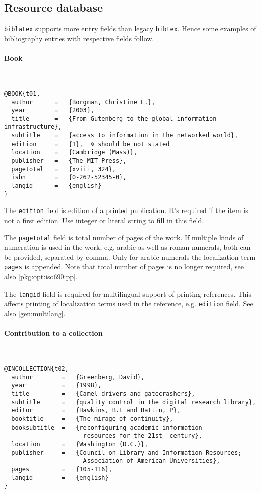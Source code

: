 \documentclass[a4paper,10pt]{ltxdockit}
\def\t|#1|{\texttt{#1}}
\def\c#1{%
\hangpara{3em}{1}%
\fullcite{#1}}
\begin{document}
\subsection{Resource database}

\t|biblatex| supports more entry fields than legacy \t|bibtex|. Hence
some examples of bibliography entries with respective fields follow.


\paragraph{Book} \hfill\\

\c{t01}
\begin{verbatim}
@BOOK{t01,
  author      =   {Borgman, Christine L.}, 
  year        =   {2003},
  title       =   {From Gutenberg to the global information infrastructure}, 
  subtitle    =   {access to information in the networked world},
  edition     =   {1},  % should be not stated
  location    =   {Cambridge (Mass)}, 
  publisher   =   {The MIT Press},
  pagetotal   =   {xviii, 324},
  isbn        =   {0-262-52345-0},
  langid      =   {english}
}
\end{verbatim} 

The \t|edition| field is edition of a printed publication. It's required
if the item is not a first edition. Use integer or literal string to fill in
this field.

The \t|pagetotal| field is total number of pages of the work. If multiple
kinds of numeration is used in the work, e.g. arabic as well as roman numerals,
both can be provided, separated by comma. Only for arabic numerals
the localization term \t|pages| is appended. Note that total number of pages
is no longer required, see also \ref{pkg:opt:iso690:pp}.

The \t|langid| field is required for multilingual support of printing
references. This affects printing of localization terms used in the reference,
e.g. \t|edition| field. See also \ref{gen:multilang}.

\paragraph{Contribution to a collection} \hfill\\

\c{t02}
\begin{verbatim}
@INCOLLECTION{t02,
  author        =   {Greenberg, David}, 
  year          =   {1998},
  title         =   {Camel drivers and gatecrashers},
  subtitle      =   {quality control in the digital research library},
  editor        =   {Hawkins, B.L and Battin, P},
  booktitle     =   {The mirage of continuity},
  booksubtitle  =   {reconfiguring academic information 
                      resources for the 21st  century}, 
  location      =   {Washington (D.C.)}, 
  publisher     =   {Council on Library and Information Resources; 
                      Association of American Universities}, 
  pages         =   {105-116},
  langid        =   {english}
}
\end{verbatim} 
\end{document}
